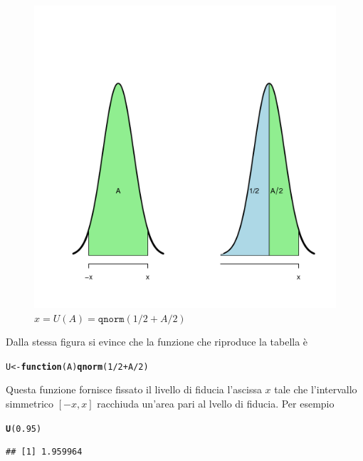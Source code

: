 \documentclass[onecolumn,12pt]{book}\usepackage[]{graphicx}\usepackage[]{color}
\makeatletter
\def\maxwidth{ %
  \ifdim\Gin@nat@width>\linewidth
    \linewidth
  \else
    \Gin@nat@width
  \fi
}
\newcommand{\hlnum}[1]{\textcolor[rgb]{0.686,0.059,0.569}{#1}}%
\newcommand{\hlopt}[1]{\textcolor[rgb]{0,0,0}{#1}}%
\newcommand{\hlstd}[1]{\textcolor[rgb]{0.345,0.345,0.345}{#1}}%
\newcommand{\hlkwa}[1]{\textcolor[rgb]{0.161,0.373,0.58}{\textbf{#1}}}%
\newcommand{\hlkwb}[1]{\textcolor[rgb]{0.69,0.353,0.396}{#1}}%
\newcommand{\hlkwc}[1]{\textcolor[rgb]{0.333,0.667,0.333}{#1}}%
\newcommand{\hlkwd}[1]{\textcolor[rgb]{0.737,0.353,0.396}{\textbf{#1}}}%
\newenvironment{kframe}{%
 \def\at@end@of@kframe{}%
 \ifinner\ifhmode%
  \def\at@end@of@kframe{\end{minipage}}%
  \begin{minipage}{\columnwidth}%
 \fi\fi%
 \def\FrameCommand##1{\hskip\@totalleftmargin \hskip-\fboxsep
 \colorbox{shadecolor}{##1}\hskip-\fboxsep
     \hskip-\linewidth \hskip-\@totalleftmargin \hskip\columnwidth}%
 \MakeFramed {\advance\hsize-\width
   \@totalleftmargin\z@ \linewidth\hsize
   \@setminipage}}%
 {\par\unskip\endMakeFramed%
 \at@end@of@kframe}
\newenvironment{knitrout}{}{} %
\makeatother
\begin{document}
\begin{figure}[H]
\begin{knitrout}
\color{fgcolor}
\includegraphics[width=\maxwidth]{figure/unnamed-chunk-144-1} 

\end{knitrout}
\caption{$x=U(A)=\texttt{qnorm}(1/2+A/2)$}
\label{fig:fig12code}
\end{figure}
Dalla stessa figura  si evince che la funzione che riproduce la tabella è
\begin{knitrout}
\color{fgcolor}\begin{kframe}
\begin{alltt}
\hlstd{U} \hlkwb{<-}\hlkwa{function} \hlstd{(}\hlkwc{A}\hlstd{)} \hlkwd{qnorm} \hlstd{(}\hlnum{1}\hlopt{/}\hlnum{2} \hlopt{+} \hlstd{A}\hlopt{/}\hlnum{2}\hlstd{)}
\end{alltt}
\end{kframe}
\end{knitrout}
Questa funzione fornisce fissato il livello di fiducia l'ascissa $x$  tale che l'intervallo simmetrico $[-x,x]$ racchiuda un'area pari al lvello di fiducia. Per esempio
\begin{knitrout}
\color{fgcolor}\begin{kframe}
\begin{alltt}
\hlkwd{U}\hlstd{(}\hlnum{0.95}\hlstd{)}
\end{alltt}
\begin{verbatim}
## [1] 1.959964
\end{verbatim}
\end{kframe}
\end{knitrout}
\end{document}
